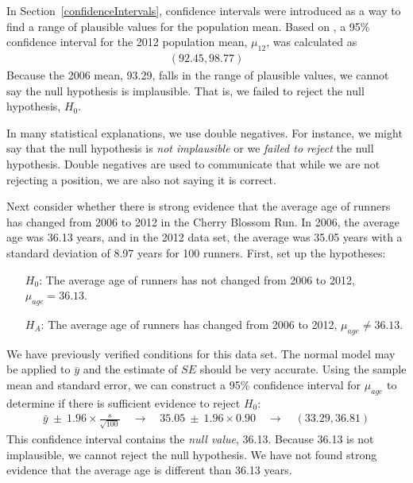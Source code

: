 In Section~\ref{confidenceIntervals}, confidence intervals were introduced as a way to find a range of plausible values for the population mean. Based on , a 95\% confidence interval for the 2012 population mean, $\mu_{12}$, was calculated as
\begin{eqnarray*}
(92.45, 98.77)
\end{eqnarray*}
Because the 2006 mean, 93.29, falls in the range of plausible values, we cannot say the null hypothesis is implausible. That is, we failed to reject the null hypothesis, $H_0$. 

\begin{tipBox}{
In many statistical explanations, we use double negatives. For instance, we might say that the null hypothesis is \emph{not implausible} or we \emph{failed to reject} the null hypothesis. Double negatives are used to communicate that while we are not rejecting a position, we are also not saying it is correct.}
\end{tipBox}

\begin{example}{Next consider whether there is strong evidence that the average age of runners has changed from 2006 to 2012 in the Cherry Blossom Run. In 2006, the average age was 36.13 years, and in the 2012  data set, the average was 35.05 years with a standard deviation of 8.97 years for 100 runners.}
First, set up the hypotheses:
\begin{itemize}
\setlength{\itemsep}{0mm}
\item[$H_0$:] The average age of runners has not changed from 2006 to 2012, $\mu_{age} = 36.13$.
\item[$H_A$:] The average age of runners has changed from 2006 to 2012, $\mu_{age} \neq 36.13$.
\end{itemize}
We have previously verified conditions for this data set. The normal model may be applied to $\bar{y}$ and the estimate of $SE$ should be very accurate. Using the sample mean and standard error, we can construct a 95\% confidence interval for $\mu_{age}$ to determine if there is sufficient evidence to reject $H_0$:
\begin{eqnarray*}
\bar{y}\ \pm\ 1.96 \times  \frac{s}{\sqrt{100}} 
	\quad\to\quad 35.05\ \pm\ 1.96\times 0.90 
	\quad\to\quad (33.29, 36.81)
\end{eqnarray*}
This confidence interval contains the \emph{null value}, 36.13. Because 36.13 is not implausible, we cannot reject the null hypothesis. We have not found strong evidence that the average age is different than 36.13 years.
\end{example}

